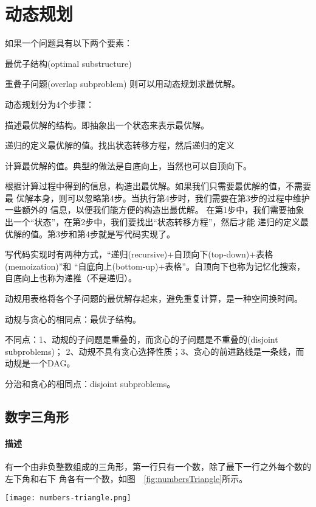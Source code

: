 \chapter{动态规划}
如果一个问题具有以下两个要素：
\begindot
\item 最优子结构(optimal substructure)
\item 重叠子问题(overlap subproblem)
\myenddot
则可以用动态规划求最优解。

动态规划分为4个步骤：
\begindot
\item 描述最优解的结构。即抽象出一个状态来表示最优解。
\item 递归的定义最优解的值。找出状态转移方程，然后递归的定义
\item 计算最优解的值。典型的做法是自底向上，当然也可以自顶向下。
\item 根据计算过程中得到的信息，构造出最优解。如果我们只需要最优解的值，不需要最
优解本身，则可以忽略第4步。当执行第4步时，我们需要在第3步的过程中维护一些额外的
信息，以便我们能方便的构造出最优解。
\myenddot
在第1步中，我们需要抽象出一个“状态”，在第2步中，我们要找出“状态转移方程”，然后才能
递归的定义最优解的值。第3步和第4步就是写代码实现了。

写代码实现时有两种方式，“递归(recursive)+自顶向下(top-down)+表格(memoization)”和
“自底向上(bottom-up)+表格”。自顶向下也称为记忆化搜索，自底向上也称为递推（不是递归）。

动规用表格将各个子问题的最优解存起来，避免重复计算，是一种空间换时间。

动规与贪心的相同点：最优子结构。

不同点：1、动规的子问题是重叠的，而贪心的子问题是不重叠的(disjoint subproblems)；
2、动规不具有贪心选择性质；3、贪心的前进路线是一条线，而动规是一个DAG。

分治和贪心的相同点：disjoint subproblems。

\section{数字三角形} %

\subsubsection{描述}
有一个由非负整数组成的三角形，第一行只有一个数，除了最下一行之外每个数的左下角和右下
角各有一个数，如图~~\ref{fig:numbersTriangle}所示。

\begin{center}
\texttt{[image: numbers-triangle.png]}\\
\label{fig:numbersTriangle}
\end{center}

